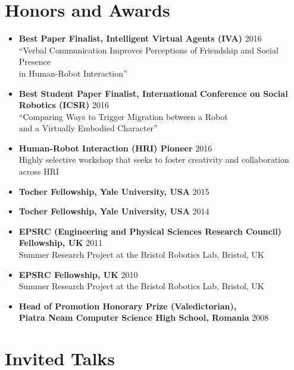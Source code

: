 \documentclass[10pt,letterpaper]{article}
\newcommand{\thing}[2]{{#1} \hfill {#2}}
\begin{document}
\section{Honors and Awards}
\begin{itemize}%
\item \thing{\bf Best Paper Finalist, Intelligent Virtual Agents (IVA)}{2016}\\
	``Verbal Communication Improves Perceptions of Friendship and Social Presence\\
	 in Human-Robot Interaction''
\item \thing{\bf Best Student Paper Finalist, International Conference on Social Robotics (ICSR)}{2016}\\
	``Comparing Ways to Trigger Migration between a Robot\\
	 and a Virtually Embodied Character''
\item \thing{\bf Human-Robot Interaction (HRI) Pioneer}{2016}\\
	 Highly selective workshop that seeks to foster creativity and collaboration across HRI
\item \thing{\bf Tocher Fellowship, Yale University, USA}{2015}
\item \thing{\bf Tocher Fellowship, Yale University, USA}{2014}
\item \thing{\bf EPSRC (Engineering and Physical Sciences Research Council) Fellowship, UK}{2011}\\
	Summer Research Project at the Bristol Robotics Lab, Bristol, UK
\item \thing{\bf EPSRC Fellowship, UK}{2010}\\
	Summer Research Project at the Bristol Robotics Lab, Bristol, UK
\item \thing{\bf Head of Promotion Honorary Prize (Valedictorian),\\Piatra Neam\cb{t} Computer Science High School, Romania}{2008}
\end{itemize}

\section{Invited Talks}
\end{document}
